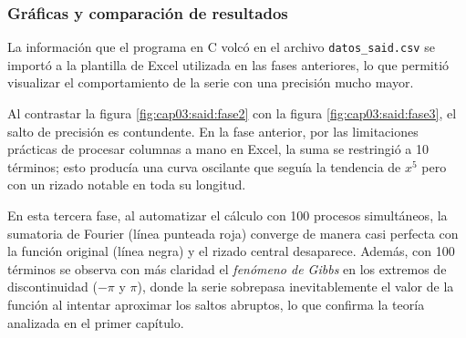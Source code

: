 



\subsubsection{Gráficas y comparación de resultados}
\label{sec:cap03:said:resultados}

La información que el programa en C volcó en el archivo \texttt{datos\_said.csv} se importó a la plantilla de Excel utilizada en las fases anteriores, lo que permitió visualizar el comportamiento de la serie con una precisión mucho mayor.



Al contrastar la figura \ref{fig:cap03:said:fase2} con la figura \ref{fig:cap03:said:fase3}, el salto de precisión es contundente. En la fase anterior, por las limitaciones prácticas de procesar columnas a mano en Excel, la suma se restringió a 10 términos; esto producía una curva oscilante que seguía la tendencia de $x^{5}$ pero con un rizado notable en toda su longitud.

En esta tercera fase, al automatizar el cálculo con 100 procesos simultáneos, la sumatoria de Fourier (línea punteada roja) converge de manera casi perfecta con la función original (línea negra) y el rizado central desaparece. Además, con 100 términos se observa con más claridad el \textit{fenómeno de Gibbs} en los extremos de discontinuidad ($-\pi$ y $\pi$), donde la serie sobrepasa inevitablemente el valor de la función al intentar aproximar los saltos abruptos, lo que confirma la teoría analizada en el primer capítulo.

